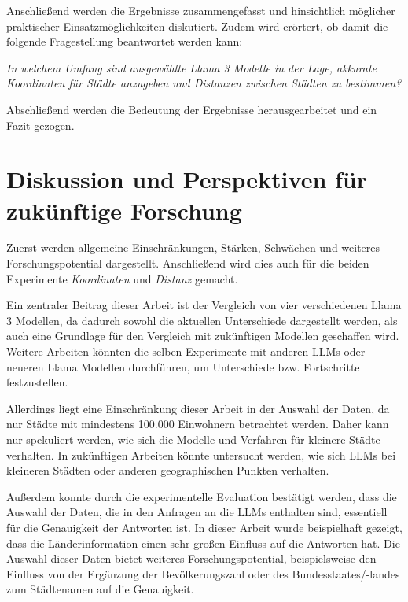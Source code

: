 Anschließend werden die Ergebnisse zusammengefasst und hinsichtlich möglicher praktischer Einsatzmöglichkeiten diskutiert.
Zudem wird erörtert, ob damit die folgende Fragestellung beantwortet werden kann:

\begin{center}
    \itshape
    In welchem Umfang sind ausgewählte Llama 3 Modelle in der Lage, akkurate Koordinaten für Städte anzugeben und Distanzen zwischen Städten zu bestimmen?
\end{center}


Abschließend werden die Bedeutung der Ergebnisse herausgearbeitet und ein Fazit gezogen.



\section{Diskussion und Perspektiven für zukünftige Forschung}
Zuerst werden allgemeine Einschränkungen, Stärken, Schwächen und weiteres Forschungspotential dargestellt.
Anschließend wird dies auch für die beiden Experimente \textit{Koordinaten} und \textit{Distanz} gemacht.

Ein zentraler Beitrag dieser Arbeit ist der Vergleich von vier verschiedenen Llama 3 Modellen, da dadurch sowohl die aktuellen Unterschiede dargestellt werden, als auch eine Grundlage für den Vergleich mit zukünftigen Modellen geschaffen wird.
Weitere Arbeiten könnten die selben Experimente mit anderen LLMs oder neueren Llama Modellen durchführen, um Unterschiede bzw. Fortschritte festzustellen.

Allerdings liegt eine Einschränkung dieser Arbeit in der Auswahl der Daten, da nur Städte mit mindestens 100.000 Einwohnern betrachtet werden.
Daher kann nur spekuliert werden, wie sich die Modelle und Verfahren für kleinere Städte verhalten.
In zukünftigen Arbeiten könnte untersucht werden, wie sich LLMs bei kleineren Städten oder anderen geographischen Punkten verhalten.

Außerdem konnte durch die experimentelle Evaluation bestätigt werden, dass die Auswahl der Daten, die in den Anfragen an die LLMs enthalten sind, essentiell für die Genauigkeit der Antworten ist.
In dieser Arbeit wurde beispielhaft gezeigt, dass die Länderinformation einen sehr großen Einfluss auf die Antworten hat.
Die Auswahl dieser Daten bietet weiteres Forschungspotential, beispielsweise den Einfluss von der Ergänzung der Bevölkerungszahl oder des Bundesstaates/-landes zum Städtenamen auf die Genauigkeit.

